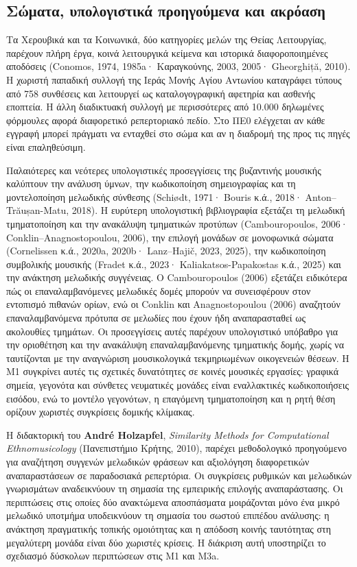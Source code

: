 \documentclass[11pt,a4paper]{article}
\begin{document}
\subsection{Σώματα, υπολογιστικά προηγούμενα και ακρόαση}

Τα Χερουβικά και τα Κοινωνικά, δύο κατηγορίες μελών της Θείας Λειτουργίας, παρέχουν πλήρη έργα, κοινά λειτουργικά κείμενα και ιστορικά διαφοροποιημένες αποδόσεις (Conomos, 1974, 1985a· Καραγκούνης, 2003, 2005· Gheorghiță, 2010). Η χωριστή παπαδική συλλογή της Ιεράς Μονής Αγίου Αντωνίου καταγράφει τύπους από 758 συνθέσεις και λειτουργεί ως καταλογογραφική αφετηρία και ασθενής εποπτεία. Η άλλη διαδικτυακή συλλογή με περισσότερες από 10.000 δηλωμένες φόρμουλες αφορά διαφορετικό ρεπερτοριακό πεδίο. Στο ΠΕ0 ελέγχεται αν κάθε εγγραφή μπορεί πράγματι να ενταχθεί στο σώμα και αν η διαδρομή της προς τις πηγές είναι επαληθεύσιμη.

Παλαιότερες και νεότερες υπολογιστικές προσεγγίσεις της βυζαντινής μουσικής καλύπτουν την ανάλυση ύμνων, την κωδικοποίηση σημειογραφίας και τη μοντελοποίηση μελωδικής σύνθεσης (Schiødt, 1971· Bouris κ.ά., 2018· Anton--Trăușan-Matu, 2018). Η ευρύτερη υπολογιστική βιβλιογραφία εξετάζει τη μελωδική τμηματοποίηση και την ανακάλυψη τμηματικών προτύπων (Cambouropoulos, 2006· Conklin--Anagnostopoulou, 2006), την επιλογή μονάδων σε μονοφωνικά σώματα (Cornelissen κ.ά., 2020a, 2020b· Lanz--Hajič, 2023, 2025), την κωδικοποίηση συμβολικής μουσικής (Fradet κ.ά., 2023· Kaliakatsos-Papakostas κ.ά., 2025) και την ανάκτηση μελωδικής συγγένειας. Ο Cambouropoulos (2006) εξετάζει ειδικότερα πώς οι επαναλαμβανόμενες μελωδικές δομές μπορούν να συνεισφέρουν στον εντοπισμό πιθανών ορίων, ενώ οι Conklin και Anagnostopoulou (2006) αναζητούν επαναλαμβανόμενα πρότυπα σε μελωδίες που έχουν ήδη αναπαρασταθεί ως ακολουθίες τμημάτων. Οι προσεγγίσεις αυτές παρέχουν υπολογιστικό υπόβαθρο για την οριοθέτηση και την ανακάλυψη επαναλαμβανόμενης τμηματικής δομής, χωρίς να ταυτίζονται με την αναγνώριση μουσικολογικά τεκμηριωμένων οικογενειών θέσεων. Η M1 συγκρίνει αυτές τις σχετικές δυνατότητες σε κοινές μουσικές εργασίες: γραφικά σημεία, γεγονότα και σύνθετες νευματικές μονάδες είναι εναλλακτικές κωδικοποιήσεις εισόδου, ενώ το μοντέλο γεγονότων, η επαγόμενη τμηματοποίηση και η ρητή θέση ορίζουν χωριστές συγκρίσεις δομικής κλίμακας.

Η διδακτορική του \textbf{André Holzapfel}, \emph{Similarity Methods for Computational Ethnomusicology} (Πανεπιστήμιο Κρήτης, 2010), παρέχει μεθοδολογικό προηγούμενο για αναζήτηση συγγενών μελωδικών φράσεων και αξιολόγηση διαφορετικών αναπαραστάσεων σε παραδοσιακά ρεπερτόρια. Οι συγκρίσεις ρυθμικών και μελωδικών γνωρισμάτων αναδεικνύουν τη σημασία της εμπειρικής επιλογής αναπαράστασης. Οι περιπτώσεις στις οποίες δύο ανακτώμενα αποσπάσματα μοιράζονται μόνο ένα μικρό μελωδικό υποτμήμα υποδεικνύουν τη σημασία του σωστού επιπέδου ανάλυσης: η ανάκτηση πραγματικής τοπικής ομοιότητας και η απόδοση κοινής ταυτότητας στη μεγαλύτερη μονάδα είναι δύο χωριστές κρίσεις. Η διάκριση αυτή υποστηρίζει το σχεδιασμό δύσκολων περιπτώσεων στις M1 και M3a.
\end{document}
